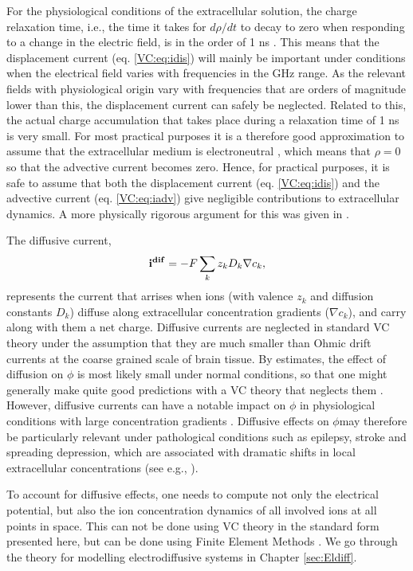 For the physiological conditions of the extracellular solution, the charge relaxation time, i.e., the time it takes for $d\rho/dt$ to decay to zero when responding to a change in the electric field, is in the order of 1 ns \cite{Grodzinsky2011, Gratiy2017}. This means that the displacement current (eq. \ref{VC:eq:idis}) will mainly be important under conditions when the electrical field varies with frequencies in the GHz range. As the relevant fields with physiological origin vary with frequencies that are orders of magnitude lower than this, the displacement current can safely be neglected. Related to this, the actual charge accumulation that takes place during a relaxation time of 1 ns is very small. For most practical purposes it is a therefore good approximation to assume that the extracellular medium is electroneutral \cite{Solbra2018}, which means that $\rho = 0$ so that the advective current becomes zero. Hence, for practical purposes, it is safe to assume that both the displacement current (eq. \ref{VC:eq:idis}) and the advective current (eq. \ref{VC:eq:iadv}) give negligible contributions to extracellular dynamics. A more physically rigorous argument for this was given in \cite{Gratiy2017}. 

The diffusive current,
\begin{equation}
{\bf i^{dif}} = -F \sum_k z_k D_k \nabla c_k,
\label{VC:eq:idif}
\end{equation}
represents the current that arrises when ions (with valence $z_k$ and diffusion constants $D_k$) diffuse along extracellular concentration gradients ($\nabla c_k$), and carry along with them a net charge. Diffusive currents are neglected in standard VC theory under the assumption that they are much smaller than Ohmic drift currents at the coarse grained scale of brain tissue. By estimates, the effect of diffusion on $\phi$ is most likely small under normal conditions, 
so that one might generally make quite good predictions with a VC theory that neglects them \cite{Halnes2016, Gratiy2017}. 
However, diffusive currents can have a notable impact on $\phi$ in physiological conditions with large concentration gradients \cite{Halnes2016, Gratiy2017}. Diffusive effects on $\phi$may therefore be particularly relevant under pathological conditions such as epilepsy, stroke and spreading depression, which are associated with dramatic shifts in local extracellular concentrations (see e.g.,  \cite{Somjen2001, Frohlich2008, Wei2014, Ayata2015}). 

To account for diffusive effects, one needs to compute not only the electrical potential, but also the ion concentration dynamics of all involved ions at all points in space. This can not be done using VC theory in the standard form presented here, but can be done using Finite Element Methods \cite{Solbra2018}. We go through the theory for modelling electrodiffusive systems in Chapter \ref{sec:Eldiff}.


